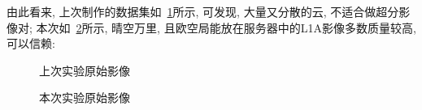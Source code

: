 由此看来, 上次制作的数据集如~\ref{fig:0203}所示, 可发现, 大量又分散的云, 不适合做超分影像对; 本次如~\ref{fig:0204}所示, 晴空万里, 且欧空局能放在服务器中的L1A影像多数质量较高, 可以信赖:
\begin{figure}[!htbp]
    \centering
    \qquad
    \caption{上次实验原始影像}
    \label{fig:0203}
\end{figure}

\begin{figure}[!htbp]
    \centering
    \qquad
    \caption{本次实验原始影像}
    \label{fig:0204}
\end{figure}

